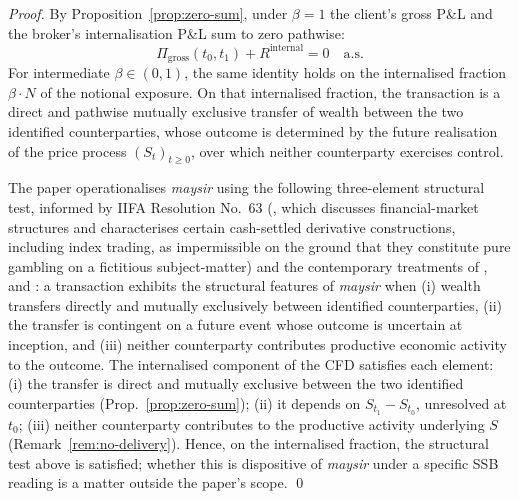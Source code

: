 \documentclass[preprint,12pt,authoryear]{elsarticle}
\theoremstyle{definition}
\begin{document}
\begin{proof}
By Proposition~\ref{prop:zero-sum}, under $\beta = 1$ the client's
gross P\&L and the broker's internalisation P\&L sum to zero
pathwise:
\begin{equation}
    \Pi_{\text{gross}}(t_0, t_1) + R^{\text{internal}} = 0
    \quad \text{a.s.}
    \label{eq:pathwise-zero-sum-repeat}
\end{equation}
For intermediate $\beta \in (0, 1)$, the same identity holds on the
internalised fraction $\beta \cdot N$ of the notional exposure. On
that internalised fraction, the transaction is a direct and
pathwise mutually exclusive transfer of wealth between the two
identified counterparties, whose outcome is determined by the
future realisation of the price process $(S_t)_{t \geq 0}$, over
which neither counterparty exercises control.

The paper operationalises \emph{maysir} using the following
three-element structural test, informed by IIFA Resolution
No.~63 (\citealp{OICFiqh63}, which discusses financial-market
structures and characterises certain cash-settled derivative
constructions, including index trading, as impermissible on
the ground that they constitute pure gambling on a fictitious
subject-matter) and the contemporary treatments of
\citet{Kamali2000}, \citet{Usmani2002} and \citet{ElGamal2006}:
a transaction exhibits the structural features of \emph{maysir}
when (i) wealth transfers directly and mutually exclusively
between identified counterparties, (ii) the transfer is
contingent on a future event whose outcome is uncertain at
inception, and (iii) neither counterparty contributes productive
economic activity to the outcome. The internalised component of
the CFD satisfies each element:
(i) the transfer is direct and mutually exclusive between the two
identified counterparties (Prop.~\ref{prop:zero-sum});
(ii) it depends on $S_{t_1} - S_{t_0}$, unresolved at $t_0$;
(iii) neither counterparty contributes to the productive activity
underlying $S$ (Remark~\ref{rem:no-delivery}).
Hence, on the internalised fraction, the structural test above
is satisfied; whether this is dispositive of \emph{maysir} under
a specific SSB reading is a matter outside the paper's scope. \qed
\end{proof}
\end{document}
